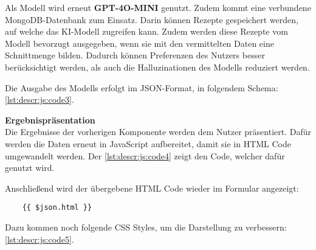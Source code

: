 Als Modell wird erneut \textbf{GPT-4O-MINI} genutzt.
Zudem kommt eine verbundene MongoDB-Datenbank zum Einsatz. Darin können Rezepte gespeichert werden, auf welche das KI-Modell zugreifen kann.
Zudem werden diese Rezepte vom Modell bevorzugt ausgegeben, wenn sie mit den vermittelten Daten eine Schnittmenge bilden.
Dadurch können Preferenzen des Nutzers besser berücksichtigt werden, als auch die Halluzinationen des Modells reduziert werden.

Die Ausgabe des Modells erfolgt im JSON-Format, in folgendem Schema: \autoref{lst:descr:js:code3}.

\textbf{Ergebnispräsentation} \\
Die Ergebnisse der vorherigen Komponente werden dem Nutzer präsentiert.
Dafür werden die Daten erneut in JavaScript aufbereitet, damit sie in HTML Code umgewandelt werden.
Der \autoref{lst:descr:js:code4} zeigt den Code, welcher dafür genutzt wird.

Anschließend wird der übergebene HTML Code wieder im Formular angezeigt:
\begin{verbatim}
    {{ $json.html }}
\end{verbatim}
Dazu kommen noch folgende CSS Styles, um die Darstellung zu verbessern: \autoref{lst:descr:js:code5}.
